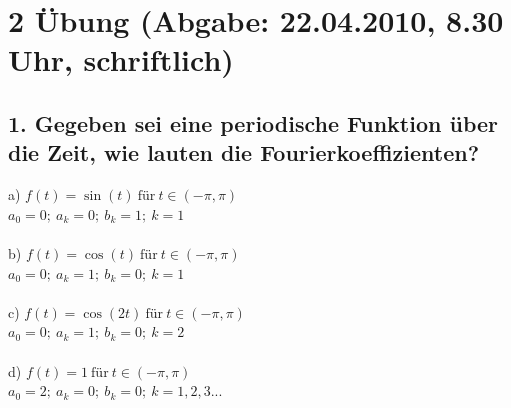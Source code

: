 \section*{2 \"Ubung (Abgabe: 22.04.2010, 8.30 Uhr, schriftlich)}

\subsection*{1. Gegeben sei eine periodische Funktion \"uber die Zeit, wie lauten die Fourierkoeffizienten?}
a) $f(t) = \sin(t)~\text{f\"ur}~t \in (-\pi, \pi)$\\
$a_0 = 0; ~ a_k = 0; ~ b_k = 1; ~ k = 1$\\\\
b) $f(t) = \cos(t)~\text{f\"ur}~t \in (-\pi, \pi)$\\
$a_0 = 0; ~ a_k = 1; ~ b_k = 0; ~ k = 1$\\\\
c) $f(t) = \cos(2t)~\text{f\"ur}~t \in (-\pi, \pi)$\\
$a_0 = 0; ~ a_k = 1; ~ b_k = 0; ~ k = 2$\\\\
d) $f(t) = 1~\text{f\"ur}~t \in (-\pi, \pi)$\\
$a_0 = 2; ~ a_k = 0; ~ b_k = 0; ~ k = 1,2,3...$

